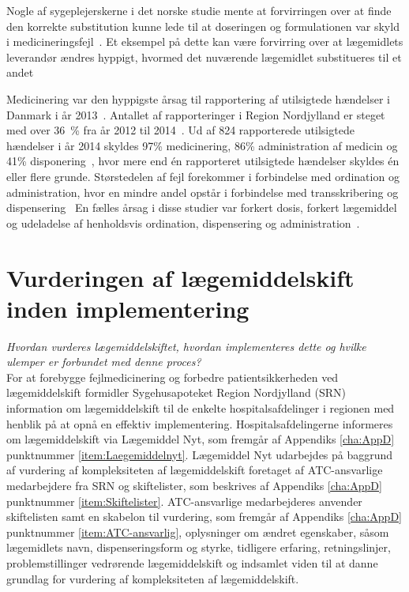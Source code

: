 Nogle af sygeplejerskerne i det norske studie mente at forvirringen over at finde den korrekte substitution kunne lede til at doseringen og formulationen var skyld i medicineringsfejl~\citep{Hakonsen2010}.%
Et eksempel på dette kan være forvirring over at lægemidlets leverandør ændres hyppigt, hvormed det nuværende lægemidlet substitueres til et andet~\citep{Wittich2014}

Medicinering var den hyppigste årsag til rapportering af utilsigtede hændelser i Danmark i år 2013~\citep{Patientombuddet2013}. Antallet af rapporteringer i Region Nordjylland er steget med over 36~\% fra år 2012 til 2014~\citep{Jensen2014}. Ud af 824 rapporterede utilsigtede hændelser i år 2014 skyldes 97\% medicinering, 86\% administration af medicin og 41\% disponering~\citep{Jensen2014}, hvor mere end én rapporteret utilsigtede hændelser skyldes én eller flere grunde.  %
Størstedelen af fejl forekommer i forbindelse med ordination og administration, hvor en mindre andel opstår i forbindelse med transskribering og dispensering~\citep{Agrawal2009, Anderson2002} En fælles årsag i disse studier var forkert dosis, forkert lægemiddel og udeladelse af henholdsvis ordination, dispensering og administration~\citep{Barker2002,Sundhedsstyrelsen2005,Lisby2005, Tully2009}.

\section{Vurderingen af lægemiddelskift inden implementering} \label{sec:ImpLaeg}
\textit{Hvordan vurderes lægemiddelskiftet, hvordan implementeres dette og hvilke ulemper er forbundet med denne proces?} \\
For at forebygge fejlmedicinering og forbedre patientsikkerheden ved lægemiddelskift formidler Sygehusapoteket Region Nordjylland (SRN) information om lægemiddelskift til de enkelte hospitalsafdelinger i regionen med henblik på at opnå en effektiv implementering. Hospitalsafdelingerne informeres om lægemiddelskift via Lægemiddel Nyt, som fremgår af Appendiks \ref{cha:AppD} punktnummer \ref{item:Laegemiddelnyt}. Lægemiddel Nyt udarbejdes på baggrund af vurdering af kompleksiteten af lægemiddelskift foretaget af ATC-ansvarlige medarbejdere fra SRN og skiftelister, som beskrives af Appendiks \ref{cha:AppD} punktnummer \ref{item:Skiftelister}. ATC-ansvarlige medarbejderes anvender skiftelisten samt en skabelon til vurdering, som fremgår af Appendiks \ref{cha:AppD} punktnummer \ref{item:ATC-ansvarlig}, oplysninger om ændret egenskaber, såsom lægemidlets navn, dispenseringsform og styrke, tidligere erfaring, retningslinjer, problemstillinger vedrørende lægemiddelskift og indsamlet viden til at danne grundlag for vurdering af kompleksiteten af lægemiddelskift.

